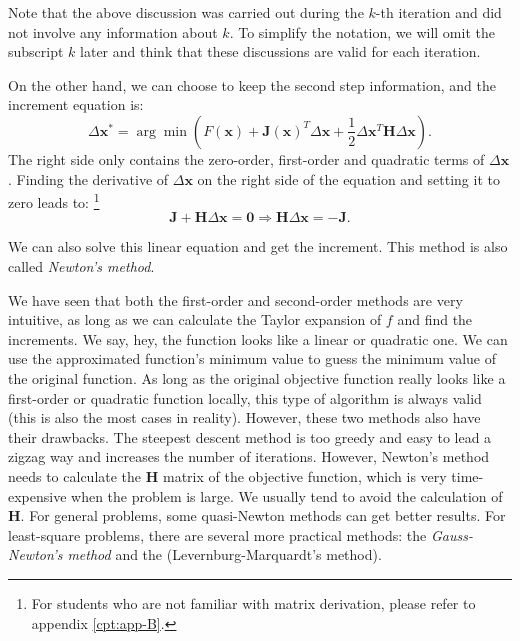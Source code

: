 Note that the above discussion was carried out during the $k$-th iteration and did not involve any information about $k$. To simplify the notation, we will omit the subscript $k$ later and think that these discussions are valid for each iteration.

On the other hand, we can choose to keep the second step information, and the increment equation is:
\begin{equation}
    \Delta \mathbf{x}^* = \arg \min \left(F\left( \mathbf{x} \right) + \mathbf{J} \left( \mathbf{x} \right)^T \Delta \mathbf{x} + \frac{1}{2}\Delta {\mathbf{x}^T}\mathbf{H} \Delta \mathbf{x} \right).
\end{equation}
The right side only contains the zero-order, first-order and quadratic terms of $\Delta \mathbf{x}$. Finding the derivative of $\Delta \mathbf{x}$ on the right side of the equation and setting it to zero leads to: \footnote{For students who are not familiar with matrix derivation, please refer to appendix \ref{cpt:app-B}. }
\begin{equation}
    \label{eq:newton-method}
    \mathbf{J} + \mathbf{H} \Delta \mathbf{x} = \mathbf{0} \Rightarrow
    \mathbf{H} \Delta \mathbf{x} = -\mathbf{J}.
\end{equation}

We can also solve this linear equation and get the increment. This method is also called \textit{Newton's method}.

We have seen that both the first-order and second-order methods are very intuitive, as long as we can calculate the Taylor expansion of $f$ and find the increments. We say, hey, the function looks like a linear or quadratic one. We can use the approximated function's minimum value to guess the minimum value of the original function. As long as the original objective function really looks like a first-order or quadratic function locally, this type of algorithm is always valid (this is also the most cases in reality). However, these two methods also have their drawbacks. The steepest descent method is too greedy and easy to lead a zigzag way and increases the number of iterations. However, Newton's method needs to calculate the $\mathbf{H}$ matrix of the objective function, which is very time-expensive when the problem is large. We usually tend to avoid the calculation of $\mathbf{H}$. For general problems, some quasi-Newton methods can get better results. For least-square problems, there are several more practical methods: the \textit{Gauss-Newton's method} and the (Levernburg-Marquardt's method).

